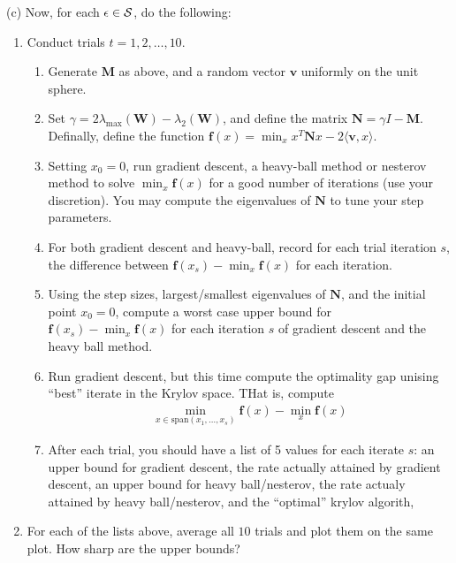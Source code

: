 \documentclass[12pt]{article}
\begin{document}
	(c) Now, for each $\epsilon \in {\cal S}$, do the following:
	\begin{enumerate}
		\item Conduct trials $t = 1,2,\dots,10$.
		\begin{enumerate}
		\item Generate $\mathbf{M}$ as above, and a random vector $\mathbf{v}$ uniformly on the unit sphere. 
		\item Set $\gamma = 2\lambda_{\max}(\mathbf{W}) - \lambda_{2}(\mathbf{W})$, and define the matrix $\mathbf{N} = \gamma I  - \mathbf{M}$. Definally, define the function $\mathbf{f}(x) = \min_{x} x^T \mathbf{N} x - 2 \langle \mathbf{v}, x \rangle$. 
		\item Setting $x_0 = 0$, run gradient descent, a heavy-ball method or nesterov method to solve $\min_{x} \mathbf{f}(x)$ for a good number of iterations (use your discretion). You may compute the eigenvalues of $\mathbf{N}$ to tune your step parameters. 
		\item For both gradient descent and heavy-ball, record for each trial iteration $s$, the difference between $\mathbf{f}(x_s) - \min_{x} \mathbf{f}(x)$ for each iteration. 
		\item Using the step sizes, largest/smallest eigenvalues of $\mathbf{N}$, and the initial point $x_0 = 0$, compute a worst case upper bound for $\mathbf{f}(x_s) - \min_{x} \mathbf{f}(x)$ for each iteration $s$ of gradient descent and the heavy ball method.
		\item Run gradient descent, but this time compute the optimality gap unising ``best'' iterate in the Krylov space. THat is, compute 
		\begin{eqnarray}
		\min_{x \in \mathrm{span}(x_1,\dots,x_s)}\mathbf{f}(x) - \min_{x} \mathbf{f}(x)
		\end{eqnarray}
		\item After each trial, you should have a list of 5 values for each iterate $s$: an upper bound for gradient descent, the rate actually attained by gradient descent, an upper bound for heavy ball/nesterov, the rate actualy attained by heavy ball/nesterov, and the ``optimal'' krylov algorith,
	\end{enumerate}
	\item For each of the lists above, average all $10$ trials and plot them on the same plot. How sharp are the upper bounds?
	\end{enumerate}
\end{document}
